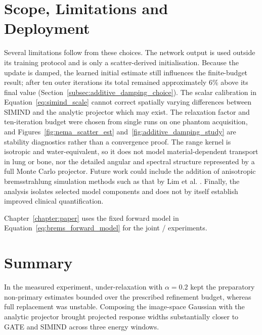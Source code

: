 \section{Scope, Limitations and Deployment}
\label{sec:brems_deployment}


Several limitations follow from these choices. The network output is used outside its training protocol and is only a scatter-derived initialisation. Because the update is damped, the learned initial estimate still influences the finite-budget result; after ten outer iterations its total remained approximately 6\% above its final value (Section~\ref{subsec:additive_damping_choice}). The scalar calibration in Equation~\ref{eq:simind_scale} cannot correct spatially varying differences between SIMIND and the analytic projector which may exist. The relaxation factor and ten-iteration budget were chosen from single runs on one phantom acquisition, and Figures~\ref{fig:nema_scatter_est} and~\ref{fig:additive_damping_study} are stability diagnostics rather than a convergence proof. The range kernel is isotropic and water-equivalent, so it does not model material-dependent transport in lung or bone, nor the detailed angular and spectral structure represented by a full Monte Carlo projector. Future work could include the addition of anisotropic bremsstrahlung simulation methods such as that by Lim et al. \cite{lim_y-90_2018}. Finally, the analysis isolates selected model components and does not by itself establish improved clinical quantification.

Chapter~\ref{chapter:paper} uses the fixed forward model in Equation~\ref{eq:brems_forward_model} for the joint  / experiments.


\section{Summary}

In the measured  experiment, under-relaxation with $\alpha=0.2$ kept the preparatory non-primary estimates bounded over the prescribed refinement budget, whereas full replacement was unstable. Composing the image-space Gaussian with the analytic projector brought projected response widths substantially closer to GATE and SIMIND across three energy windows.
